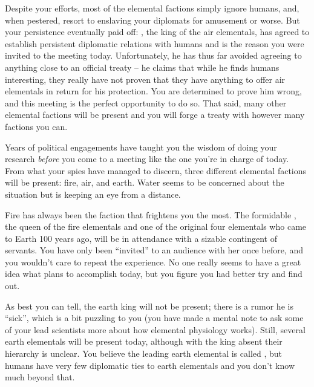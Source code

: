 \documentclass[char]{elementals}
\begin{document}
Despite your efforts, most of the elemental factions simply ignore humans, and, when pestered, resort to enslaving your diplomats for amusement or worse. But your persistence eventually paid off: \cKing{\intro}, the king of the air elementals, has agreed to establish persistent diplomatic relations with humans and is the reason you were invited to the meeting today. Unfortunately, he has thus far avoided agreeing to anything close to an official treaty -- he claims that while he finds humans interesting, they really have not proven that they have anything to offer air elementals in return for his protection. You are determined to prove him wrong, and this meeting is the perfect opportunity to do so. That said, many other elemental factions will be present and you will forge a treaty with however many factions you can.

Years of political engagements have taught you the wisdom of doing your research \emph{before} you come to a meeting like the one you're in charge of today. From what your spies have managed to discern, three different elemental factions will be present: fire, air, and earth. Water seems to be concerned about the situation but is keeping an eye from a distance.


Fire has always been the faction that frightens you the most. The formidable \cQueen{\intro}, the queen of the fire elementals and one of the original four elementals who came to Earth 100 years ago, will be in attendance with a sizable contingent of servants. You have only been ``invited'' to an audience with her once before, and you wouldn't care to repeat the experience. No one really seems to have a great idea what \cQueen{} plans to accomplish today, but you figure you had better try and find out.

As best you can tell, the earth king will not be present; there is a rumor he is ``sick'', which is a bit puzzling to you (you have made a mental note to ask some of your lead scientists more about how elemental physiology works). Still, several earth elementals will be present today, although with the king absent their hierarchy is unclear. You believe the leading earth elemental is called \cLoyal{\intro}, but humans have very few diplomatic ties to earth elementals and you don't know much beyond that.
\end{document}
